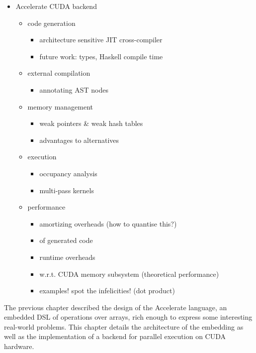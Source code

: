 \begin{itemize}
    \item Accelerate CUDA backend
        \begin{itemize}
            \item code generation
                \begin{itemize}
                    \item architecture sensitive JIT cross-compiler
                    \item future work: types, Haskell compile time
                \end{itemize}
            \item external compilation
                \begin{itemize}
                    \item annotating AST nodes
                \end{itemize}
            \item memory management
                \begin{itemize}
                    \item weak pointers \& weak hash tables
                    \item advantages to alternatives
                \end{itemize}
            \item execution
                \begin{itemize}
                    \item occupancy analysis
                    \item multi-pass kernels
                \end{itemize}
            \item performance
                \begin{itemize}
                    \item amortizing overheads (how to quantise this?)
                    \item of generated code
                    \item runtime overheads
                    \item w.r.t. CUDA memory subsystem (theoretical performance)
                    \item examples! spot the infelicities! (dot product)
                \end{itemize}
        \end{itemize}

\end{itemize}


The previous chapter described the design of the Accelerate language, an
embedded DSL of operations over arrays, rich enough to express some interesting
real-world problems. This chapter details the architecture of the embedding as
well as the implementation of a backend for parallel execution on CUDA hardware.

